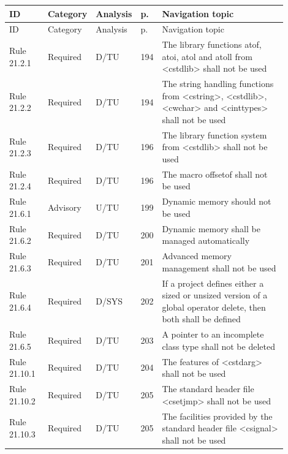 \documentclass[10pt,letterpaper]{article}
\begin{document}
\begin{longtable}{p{0.14\linewidth}p{0.14\linewidth}p{0.1\linewidth}p{0.045\linewidth}p{0.475\linewidth}}
\toprule
ID & Category & Analysis & p. & Navigation topic\\ \midrule
\endfirsthead
\toprule
ID & Category & Analysis & p. & Navigation topic\\ \midrule
\endhead
Rule 21.2.1 & Required & D/TU & 194 & The library functions atof, atoi, atol and atoll from \textless{}cstdlib\textgreater{} shall not be used\\
Rule 21.2.2 & Required & D/TU & 194 & The string handling functions from \textless{}cstring\textgreater{}, \textless{}cstdlib\textgreater{}, \textless{}cwchar\textgreater{} and \textless{}cinttypes\textgreater{} shall not be used\\
Rule 21.2.3 & Required & D/TU & 196 & The library function system from \textless{}cstdlib\textgreater{} shall not be used\\
Rule 21.2.4 & Required & D/TU & 196 & The macro offsetof shall not be used\\
Rule 21.6.1 & Advisory & U/TU & 199 & Dynamic memory should not be used\\
Rule 21.6.2 & Required & D/TU & 200 & Dynamic memory shall be managed automatically\\
Rule 21.6.3 & Required & D/TU & 201 & Advanced memory management shall not be used\\
Rule 21.6.4 & Required & D/SYS & 202 & If a project defines either a sized or unsized version of a global operator delete, then both shall be defined\\
Rule 21.6.5 & Required & D/TU & 203 & A pointer to an incomplete class type shall not be deleted\\
Rule 21.10.1 & Required & D/TU & 204 & The features of \textless{}cstdarg\textgreater{} shall not be used\\
Rule 21.10.2 & Required & D/TU & 205 & The standard header file \textless{}csetjmp\textgreater{} shall not be used\\
Rule 21.10.3 & Required & D/TU & 205 & The facilities provided by the standard header file \textless{}csignal\textgreater{} shall not be used\\
\bottomrule
\end{longtable}
\normalsize
\end{document}

